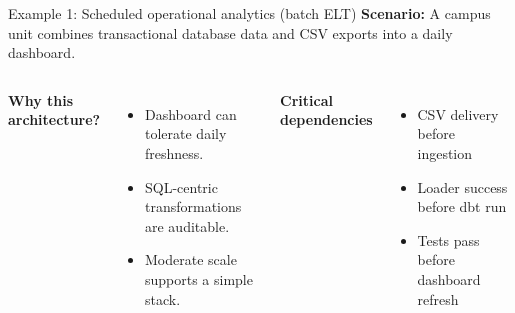 \documentclass[aspectratio=43,10pt]{beamer}
\begin{document}
\begin{frame}{Example 1: Scheduled operational analytics (batch ELT)}
\textbf{Scenario:} A campus unit combines transactional database data and CSV exports into a daily dashboard.
\vspace{.6em}
\centering
{}
\vspace{-1em}
\begin{columns}[T]
\textbf{Why this architecture?}
\begin{itemize}\item Dashboard can tolerate daily freshness.\item SQL-centric transformations are auditable.\item Moderate scale supports a simple stack.\end{itemize}
\textbf{Critical dependencies}
\begin{itemize}\item CSV delivery before ingestion\item Loader success before dbt run\item Tests pass before dashboard refresh\end{itemize}
\end{columns}
\end{frame}
\end{document}
